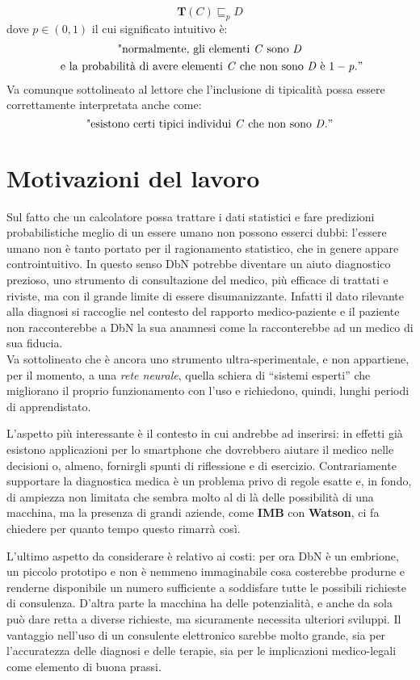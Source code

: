 \[ \mathbf{T}(\mathit{C})\sqsubseteq_{p} \mathit{D} \]
dove $ \mathit{p} \in (0,1) $ il cui significato intuitivo è:
\begin{multline*}
\text{"normalmente, gli elementi } \mathit{C}  \text{ sono } \mathit{D} \\
\text{ e la probabilità di avere elementi } \mathit{C} 
\text{ che non sono } \mathit{D} \text{ è } 1 -\mathit{p}."
\end{multline*}
Va comunque sottolineato al lettore che l'inclusione di tipicalità possa essere correttamente 
interpretata anche come:
\begin{equation*}
	\text{"esistono certi tipici individui } \mathit{C} \text{ che non sono } \mathit{D}."
\end{equation*}

\section{Motivazioni del lavoro}
Sul fatto che un calcolatore possa trattare i dati statistici e fare predizioni probabilistiche meglio di un essere umano non possono esserci dubbi:
l’essere umano non è tanto portato per il ragionamento statistico, che in genere appare controintuitivo. 
In questo senso DbN potrebbe diventare un aiuto diagnostico prezioso, uno strumento di consultazione del medico, più efficace di trattati e riviste, ma con il grande limite di essere disumanizzante. Infatti il dato rilevante alla diagnosi si raccoglie nel contesto del rapporto medico-paziente e il paziente non racconterebbe a DbN la sua anamnesi come la racconterebbe ad un medico di sua fiducia.\\ 
Va sottolineato che è ancora uno strumento ultra-sperimentale, e non appartiene, per il momento, a
una \textit{rete neurale}, quella schiera di “sistemi esperti” che migliorano il proprio funzionamento con l’uso e richiedono, quindi, lunghi periodi di apprendistato.

L’aspetto più interessante è il contesto in cui andrebbe ad inserirsi: in effetti già esistono applicazioni per lo smartphone che dovrebbero aiutare il medico nelle decisioni o, almeno, fornirgli spunti di riflessione e di esercizio. Contrariamente supportare la diagnostica medica è un problema privo di regole esatte e, in fondo, di ampiezza non limitata che sembra molto al di là delle possibilità di una macchina, ma la presenza di grandi aziende, come \textbf{IMB} con \textbf{Watson}, ci fa chiedere per quanto tempo questo rimarrà così.

L’ultimo aspetto da considerare è relativo ai costi: per ora DbN è un embrione, un piccolo prototipo e non è nemmeno immaginabile cosa costerebbe produrne e renderne disponibile un numero sufficiente a soddisfare tutte le possibili richieste di consulenza. D’altra parte la macchina ha delle potenzialità, e anche da sola può dare retta a diverse richieste, ma sicuramente necessita ulteriori sviluppi.
Il vantaggio nell'uso di un consulente elettronico sarebbe molto grande, sia per l’accuratezza delle diagnosi e delle terapie, sia per le implicazioni medico-legali come elemento di buona prassi.




